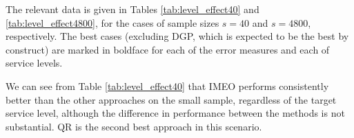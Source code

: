 \documentclass[a4paper,11pt]{article}
\begin{document}
The relevant data is given in Tables \ref{tab:level_effect40} and \ref{tab:level_effect4800}, for the cases of sample sizes $s=40$
and $s=4800$, respectively. The best cases (excluding DGP, which is expected to be the best by construct) are marked in boldface for each of the error measures and each of service levels.

\begin{table}[htb]
\caption{Target service level effect with $s=40$}
\label{tab:level_effect40}
\centering
{}
\end{table}

We can see from Table \ref{tab:level_effect40} that IMEO performs consistently better than the other approaches on the small sample, regardless of the target service level, although the difference in performance between the methods is not substantial. QR is the second best approach in this scenario.
\end{document}
